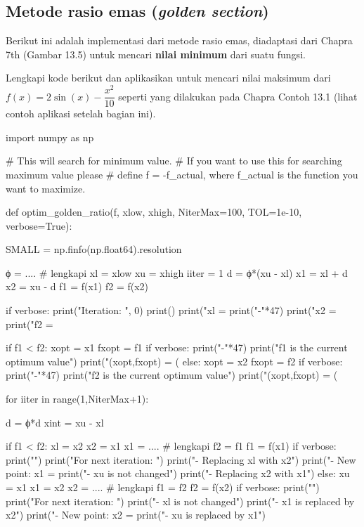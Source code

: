 \subsection{Metode rasio emas (\textit{golden section})}

Berikut ini adalah implementasi dari metode rasio emas,
diadaptasi dari Chapra 7th (Gambar 13.5) untuk mencari
\textbf{nilai minimum} dari suatu fungsi.

\begin{soal}
Lengkapi kode berikut dan aplikasikan untuk mencari nilai maksimum dari
$f(x) = 2\sin(x) - \dfrac{x^2}{10}$ seperti yang dilakukan pada Chapra
Contoh 13.1 (lihat contoh aplikasi setelah bagian ini).
\end{soal}

\begin{pythoncode}
import numpy as np

# This will search for minimum value.
# If you want to use this for searching maximum value please
# define f = -f_actual, where f_actual is the function you want to maximize.

def optim_golden_ratio(f, xlow, xhigh, NiterMax=100, TOL=1e-10, verbose=True):

    SMALL = np.finfo(np.float64).resolution

    ϕ = .... # lengkapi
    xl = xlow
    xu = xhigh
    iiter = 1
    d = ϕ*(xu - xl)
    x1 = xl + d
    x2 = xu - d
    f1 = f(x1)
    f2 = f(x2)

    if verbose:
        print("Iteration: ", 0)
        print()
        print("xl = %
        print("-"*47)
        print("x2 = %
        print("f2 = %

    if f1 < f2:
        xopt = x1
        fxopt = f1
        if verbose:
            print("-"*47)
            print("f1 is the current optimum value")
            print("(xopt,fxopt) = (%
    else:
        xopt = x2
        fxopt = f2
        if verbose:
            print("-"*47)
            print("f2 is the current optimum value")
            print("(xopt,fxopt) = (%

    for iiter in range(1,NiterMax+1):

        d = ϕ*d
        xint = xu - xl

        if f1 < f2:
            xl = x2
            x2 = x1
            x1 = .... # lengkapi
            f2 = f1
            f1 = f(x1)
            if verbose:
                print("")
                print("For next iteration: ")
                print("- Replacing xl with x2")
                print("- New point: x1 = %
                print("- xu is not changed")
                print("- Replacing x2 with x1")
        else:
            xu = x1
            x1 = x2
            x2 = .... # lengkapi
            f1 = f2
            f2 = f(x2)
            if verbose:
                print("")
                print("For next iteration: ")
                print("- xl is not changed")
                print("- x1 is replaced by x2")
                print("- New point: x2 = %
                print("- xu is replaced by x1")


\end{pythoncode}
